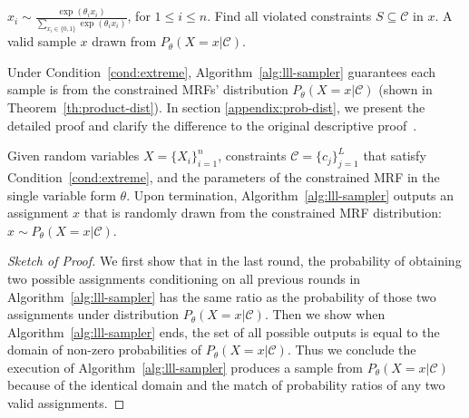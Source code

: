 \begin{algorithm}[t]
    \caption{Sampling Through Lov\'asz Local Lemma.}\label{alg:lll-sampler}
    \begin{algorithmic}[1]
        \State $x_i\sim\frac{\exp(\theta_i x_i)}{\sum_{x_i\in \{0,1\}}\exp(\theta_ix_i)}$, for $1\le i\le n$. 
        \State Find all violated constraints $S\subseteq \mathcal{C}$ in $x$.
        \EndWhile
        \Return  A valid sample $x$ drawn from $P_{\theta}(X=x|\mathcal{C})$.
    \end{algorithmic}
\end{algorithm}

Under Condition~\ref{cond:extreme}, Algorithm~\ref{alg:lll-sampler} guarantees
each sample is from the constrained MRFs' distribution $P_\theta(X=x |
    \mathcal{C})$ (shown in Theorem~\ref{th:product-dist}).
%
In section \ref{appendix:prob-dist}, we present the detailed proof and clarify
the difference to the original descriptive
proof~\citep{DBLP:journals/jacm/GuoJL19}.
\begin{theorem} \label{th:product-dist}
    Given  random variables $X=\{X_{i}\}_{i=1}^n$, constraints $\mathcal{C}=\{c_j\}_{j=1}^L$ that satisfy Condition~\ref{cond:extreme}, and the parameters of the constrained MRF in the single variable form  $\theta$. Upon termination, Algorithm~\ref{alg:lll-sampler}  outputs an assignment $x$ that is randomly drawn from the constrained MRF distribution: $x\sim P_\theta(X=x | \mathcal{C})$.

    \begin{proof}[Sketch of Proof] We first show that in the last round, the probability of obtaining two possible assignments conditioning on all previous rounds in Algorithm~\ref{alg:lll-sampler} has the same ratio as the probability of those two assignments under distribution $P_\theta(X=x | \mathcal{C})$.
        Then we show when {Algorithm~\ref{alg:lll-sampler}} ends, the set of all
        possible outputs is equal to the domain of non-zero probabilities of
        $P_\theta(X=x | \mathcal{C})$.
        Thus we conclude the execution of Algorithm~\ref{alg:lll-sampler} produces a
        sample from $P_{\theta}(X=x|\mathcal{C})$ because of the identical domain and
        the match of probability ratios of any two {valid} assignments.
    \end{proof}
\end{theorem}

